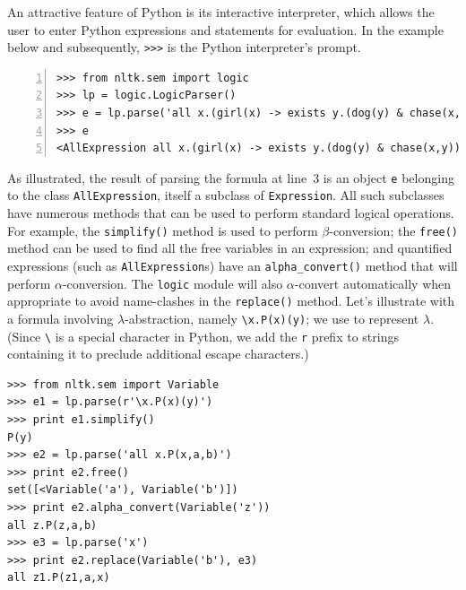 \documentclass[11pt, a4paper]{article}
\begin{document}
An attractive feature of Python is its interactive interpreter,
which allows the user to enter Python expressions and statements for
evaluation. In the example below and subsequently, \verb!>>>! is the
Python interpreter's prompt. 
\begin{Verbatim}[numbers=left]
>>> from nltk.sem import logic
>>> lp = logic.LogicParser()
>>> e = lp.parse('all x.(girl(x) -> exists y.(dog(y) & chase(x,y)))')
>>> e
<AllExpression all x.(girl(x) -> exists y.(dog(y) & chase(x,y)))>
\end{Verbatim}
As illustrated, the result of parsing the formula at line~3 is an object
\texttt{e} belonging to the class \texttt{AllExpression}, itself a
subclass of \texttt{Expression}.  All such subclasses have numerous
methods that can be used to perform standard logical operations. For
example, the \texttt{simplify()} method is used to perform
$\beta$-conversion; the \texttt{free()} method can be used to find
all the free variables in an expression; and quantified expressions
(such as \texttt{AllExpression}s) have an \texttt{alpha\_convert()}
method that will perform $\alpha$-conversion.  The \texttt{logic}
module will also $\alpha$-convert automatically when appropriate to
avoid name-clashes in the \texttt{replace()} method. Let's illustrate
with a formula involving $\lambda$-abstraction, namely
\verb!\x.P(x)(y)!; we use \protect{\verb!\!} to represent
$\lambda$. (Since \verb!\! is a special character in Python,
we add the \texttt{r} prefix to strings containing it to preclude
additional escape characters.)
\begin{Verbatim}
>>> from nltk.sem import Variable
>>> e1 = lp.parse(r'\x.P(x)(y)')
>>> print e1.simplify()
P(y)
>>> e2 = lp.parse('all x.P(x,a,b)')
>>> print e2.free()
set([<Variable('a'), Variable('b')])
>>> print e2.alpha_convert(Variable('z'))
all z.P(z,a,b)
>>> e3 = lp.parse('x')
>>> print e2.replace(Variable('b'), e3)
all z1.P(z1,a,x)
\end{Verbatim}
\end{document}
